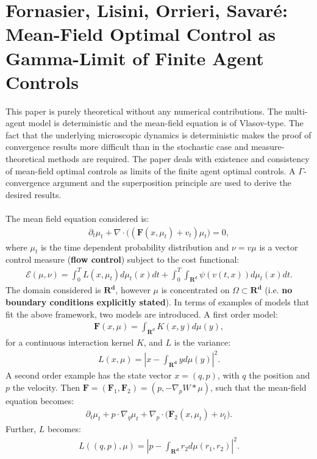 \documentclass[11pt, a4paper]{article}
\theoremstyle{definition}
\begin{document}
\section{Fornasier, Lisini, Orrieri, Savar\'e: Mean-Field Optimal Control as Gamma-Limit of Finite Agent Controls \cite{fornasier_lisini_orrieri_savare_2019}}
This paper is purely theoretical without any numerical contributions. The multi-agent model is deterministic and the mean-field equation is of Vlasov-type. The fact that the underlying microscopic dynamics is deterministic makes the proof of convergence results more difficult than in the stochastic case and measure-theoretical methods are required. The paper deals with existence and consistency of mean-field optimal controls as limits of the finite agent optimal controls. A $\Gamma$-convergence argument and the superposition principle are used to derive the desired results.
\\
\\
The mean field equation considered is:
\begin{align*}
\partial_t \mu_t + \nabla \cdot \bigg( (\mathbf{F} (x, \mu_t) + v_t) \mu_t\bigg)=0,
\end{align*}
where $\mu_t$ is the time dependent probability distribution and $\nu=v\mu$ is a vector control measure (\textbf{flow control}) subject to the cost functional:
\begin{align*}
\mathcal{E} (\mu, \nu) = \int_0^T L(x,\mu_t)d \mu_t(x) dt + \int_0^T \int_{\mathbf{R}^{d}} \psi(v(t,x))d \mu_t(x) dt.
\end{align*}
The domain considered is $\mathbf{R^d}$, however $\mu$ is concentrated on $\Omega \subset \mathbf{R^d}$ (i.e. \textbf{no boundary conditions explicitly stated}).
In terms of examples of models that fit the above framework, two models are introduced. A first order model:
\begin{align*}
\mathbf{F}(x,\mu)= \int_{\mathbf{R}^{d}} K(x,y) d \mu(y), 
\end{align*}
for a continuous interaction kernel $K$, and $L$ is the variance:
\begin{align*}
L(x, \mu) = |x - \int_{\mathbf{R^d}} y d \mu(y)|^2.
\end{align*}
A second order example has the state vector $x=(q,p)$, with $q$ the position and $p$ the velocity. Then $\mathbf{F}= (\mathbf{F}_1, \mathbf{F}_2)=(p,-\nabla_pW \ast \mu)$, such that the mean-field equation becomes:
\begin{align*}
\partial_t \mu_t + p \cdot \nabla_q \mu_t + \nabla_p  \cdot \bigg(\mathbf{F}_2(x,\mu_t) + \nu_t\bigg).
\end{align*}
Further, $L$ becomes:
\begin{align*}
L((q,p),\mu) = | p - \int_{\mathbf{R^d}}r_2 d \mu(r_1,r_2)|^2.
\end{align*}
\end{document}
